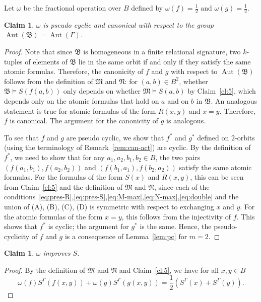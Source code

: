\documentclass[nonacm]{acmart}
\newcommand{\bB}{{\mathfrak B}}
\newcommand{\bM}{{\mathfrak M}}
\newcommand{\bN}{{\mathfrak N}}
\DeclareMathOperator{\Aut}{Aut}
\newtheorem{claim}[theorem]{Claim}
\begin{document}
Let $\omega$ be the fractional operation over $B$ defined by $\omega(f) = \frac{1}{2}$ and $\omega(g) = \frac{1}{2}$. 

\begin{claim} \label{cl:6}
$\omega$ is pseudo cyclic and canonical with respect to the group $\Aut(\bB)=\Aut(\Gamma)$.
\end{claim}

\begin{proof}
Note that since $\bB$ is homogeneous in a finite relational signature, two $k$-tuples of elements of $\bB$ lie in the same orbit if and only if they satisfy the same atomic formulas. 
Therefore, the canonicity of $f$ and $g$ with respect to $\Aut(\bB)$ follows from the definition of $\bM$ and $\bN$:
for $(a,b) \in B^2$, whether $\bB \models S(f(a,b))$ only depends on whether $\bM \models S(a,b)$ by Claim~\ref{cl:5}, which depends only on the atomic formulas that hold on $a$ and on $b$ in $\bB$. An analogous statement is true for atomic formulas of the form $R(x,y)$ and $x=y$.
Therefore, $f$ is canonical.
The argument for the canonicity of $g$ is analogous.

To see that $f$ and $g$ are pseudo cyclic, we show that $f^*$ and $g^*$ defined on $2$-orbits (using the terminology of Remark~\ref{rem:can-act}) are cyclic. By the definition of $f^*$, we need to show that for any $a_1, a_2, b_1, b_2 \in B$, the two pairs $(f(a_1, b_1), f(a_2,b_2))$ and $(f(b_1, a_1), f(b_2,a_2))$ satisfy the same atomic formulas. For the formulas of the form $S(x)$ and $R(x,y)$, 
this can be seen from Claim~\ref{cl:5} and the definition of $\bM$ and $\bN$, 
since each of the conditions~\eqref{eq:pres-R},\eqref{eq:pres-S},\eqref{eq:M-max},\eqref{eq:N-max},\eqref{eq:double} and the union of (A), (B), (C), (D) is symmetric with respect to exchanging $x$ and $y$. For the atomic formulas of the form $x=y$, this follows from the injectivity of $f$. This shows that $f^*$ is cyclic; the argument for $g^*$ is the same. Hence, the pseudo-cyclicity of $f$ and $g$ is a consequence of Lemma~\ref{lem:pc} for $m = 2$.
\end{proof}

\begin{claim} \label{cl:7}
$\omega$ improves $S$.
\end{claim}

\begin{proof}
By the definition of $\bM$ and $\bN$ and Claim~\ref{cl:5}, we have for all $x,y \in B$ 
$$\omega(f)S^{\Gamma}(f(x,y)) + \omega(g)S^{\Gamma}(g(x,y)) = \frac{1}{2} (S^{\Gamma}(x) + S^{\Gamma}(y)).$$
\end{proof}
\end{document}
